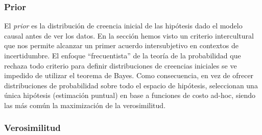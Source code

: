 \documentclass[a4paper,10pt]{book}
\theoremstyle{definition}
\begin{document}
\subsubsection*{Prior}

El \emph{prior} es la distribución de creencia inicial de las hipótesis dado el modelo causal antes de ver los datos.
%
En la sección \emph{} hemos visto un criterio intercultural que nos permite alcanzar un primer acuerdo intersubjetivo en contextos de incertidumbre.
%
El enfoque ``frecuentista'' de la teoría de la probabilidad que rechaza todo criterio para definir distribuciones de creencias iniciales se ve impedido de utilizar el teorema de Bayes.
%
Como consecuencia, en vez de ofrecer distribuciones de probabilidad sobre todo el espacio de hipótesis, seleccionan una única hipótesis (estimación puntual) en base a funciones de costo ad-hoc, siendo las más común la maximización de la verosimilitud.

\subsubsection*{Verosimilitud}
\end{document}
